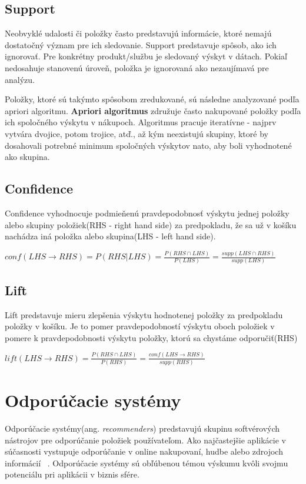 \subsection{Support}
\label{support}
Neobvyklé udalosti či položky často predstavujú informácie, ktoré nemajú dostatočný význam pre ich sledovanie. Support predstavuje spôsob, ako ich ignorovať. Pre konkrétny produkt/službu je sledovaný výskyt v dátach. Pokiaľ nedosahuje stanovenú úroveň, položka je ignorovaná ako nezaujímavá pre analýzu.

Položky, ktoré sú takýmto spôsobom zredukované, sú následne analyzované podľa apriori algoritmu. \textbf{Apriori algoritmus} združuje často nakupované položky podľa ich spoločného výskytu v nákupoch. Algoritmus pracuje iteratívne - najprv vytvára dvojice, potom trojice, atď., až kým neexistujú skupiny, ktoré by dosahovali potrebné minimum spoločných výskytov nato, aby boli vyhodnotené ako skupina.

\subsection{Confidence}
\label{confidence}
Confidence vyhodnocuje podmieňenú pravdepodobnosť výskytu jednej položky alebo skupiny položiek(RHS - right hand side) za predpokladu, že sa už v košíku nachádza iná položka alebo skupina(LHS - left hand side).

$conf(LHS\to RHS) = P(RHS | LHS) = \frac{P(RHS \cap LHS)}{P(LHS)} = \frac{supp(LHS\cap RHS)}{supp(LHS)}$

\subsection{Lift}
\label{lift}
Lift predstavuje mieru zlepšenia výskytu hodnotenej položky za predpokladu položky v košíku. Je to pomer pravdepodobností výskytu oboch položiek v pomere k pravdepodobnosti výskytu položky, ktorú sa chystáme odporučiť(RHS)

$lift(LHS\to RHS) = \frac{P(RHS \cap LHS)}{P(RHS)} = \frac{conf(LHS\to RHS)}{supp(RHS)}$


\section{Odporúčacie systémy}
\label{odporucacie_systemy}

Odporúčacie systémy(ang. \textit{recommenders}) predstavujú skupinu softvérových nástrojov pre odporúčanie položiek používateľom. Ako najčastejšie aplikácie v súčasnosti vystupuje odporúčanie v online nakupovaní, hudbe alebo zdrojoch informácií ~\cite{ricci2011introduction}. Odporúčacie systémy sú obľúbenou témou výskumu kvôli svojmu potenciálu pri aplikácii v biznis sfére.

